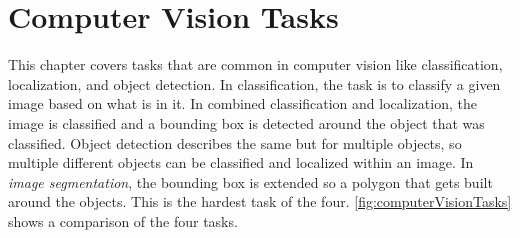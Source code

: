 \chapter{Computer Vision Tasks}
	This chapter covers tasks that are common in computer vision like classification, localization, and object detection. In classification, the task is to classify a given image based on what is in it. In combined classification and localization, the image is classified and a bounding box is detected around the object that was classified. Object detection describes the same but for multiple objects, so multiple different objects can be classified and localized within an image. In \emph{image segmentation}, the bounding box is extended so a polygon that gets built around the objects. This is the hardest task of the four. \autoref{fig:computerVisionTasks} shows a comparison of the four tasks.

